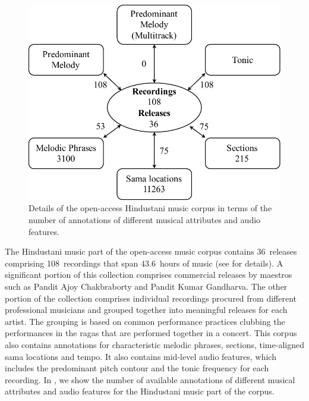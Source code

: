 \begin{figure}
	\begin{center}
		\includegraphics[width=\figSizeSeventyFive]{ch04_datasets/figures/hindustani_CC_details.pdf}
	\end{center}
	\caption[Details of the open-access Hindustani music corpus]{Details of the open-access Hindustani music corpus in terms of the number of annotations of different musical attributes and audio features.}
	\label{fig:hindustani_open_access_corpus_details_annotations}
\end{figure}

The Hindustani music part of the open-access music corpus contains 36~releases comprising 108~recordings that span 43.6~hours of music (see  for details). A significant portion of this collection comprises commercial releases by maestros such as Pandit Ajoy Chakbraborty and Pandit Kumar Gandharva. The other portion of the collection comprises individual recordings procured from different professional musicians and grouped together into meaningful releases for each artist. The grouping is based on common performance practices clubbing the performances in the \glspl{raga} that are performed together in a concert. This corpus also contains annotations for characteristic melodic phrases, sections, time-aligned sama locations and tempo. It also contains mid-level audio features, which includes the predominant pitch contour and the tonic frequency for each recording. In , we show the number of available annotations of different musical attributes and audio features for the Hindustani music part of the corpus. 

